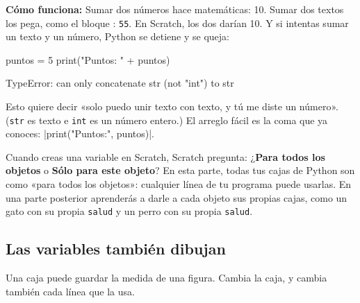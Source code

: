 \textbf{Cómo funciona:} Sumar dos números hace matemáticas: 10. Sumar dos textos los pega, como el bloque : \texttt{55}. En Scratch, los dos darían 10. Y si intentas sumar un texto y un número, Python se detiene y se queja:

\begin{codenonum}
puntos = 5
print("Puntos: " + puntos)
\end{codenonum}
\begin{errorbox}
TypeError: can only concatenate str (not "int") to str
\end{errorbox}

Esto quiere decir «solo puedo unir texto con texto, y tú me diste un número». (\texttt{str} es texto e \texttt{int} es un número entero.) El arreglo fácil es la coma que ya conoces: \py|print("Puntos:", puntos)|.

\begin{think}
Cuando creas una variable en Scratch, Scratch pregunta: ¿\textbf{Para todos los objetos} o \textbf{Sólo para este objeto}? En esta parte, todas tus cajas de Python son como «para todos los objetos»: cualquier línea de tu programa puede usarlas. En una parte posterior aprenderás a darle a cada objeto sus propias cajas, como un gato con su propia \texttt{salud} y un perro con su propia \texttt{salud}.
\end{think}

\subsection*{Las variables también dibujan}

Una caja puede guardar la medida de una figura. Cambia la caja, y cambia también cada línea que la usa.

